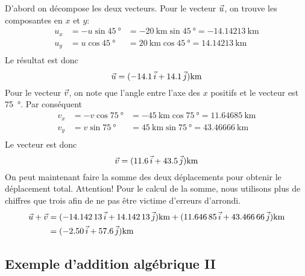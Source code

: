 {  D'abord on décompose les deux vecteurs.  Pour le vecteur $\vec{u}$, on trouve les
  composantes en $x$ et $y$:
  \begin{eqnarray*}
    u_x &= -u \sin \SI{45}{\degree} &= -\SI{20}{\kilo\meter} \sin
      \SI{45}{\degree} = -\SI{14.14213}{\kilo\meter} \\
    u_y &=  u \cos \SI{45}{\degree} &=  \SI{20}{\kilo\meter} \cos
      \SI{45}{\degree} = \SI{14.14213}{\kilo\meter} \\
  \end{eqnarray*}
  Le résultat est donc
  \[
    \vec{u} = (-\num{14.1}\, \vec{i} + \num{14.1}\, \vec{j}) \si{\kilo\meter}
  \]
  Pour le vecteur $\vec{v}$, on note que l'angle entre l'axe des $x$ positifs et
  le vecteur est \SI{75}{\degree}.  Par conséquent
  \begin{eqnarray*}
    v_x &= -v \cos \SI{75}{\degree} &= -\SI{45}{\kilo\meter} \cos
      \SI{75}{\degree} = \SI{11.64685}{\kilo\meter} \\
    v_y &=  v \sin \SI{75}{\degree} &=  \SI{45}{\kilo\meter} \sin
      \SI{75}{\degree} = \SI{43.46666}{\kilo\meter} \\
  \end{eqnarray*}
  Le vecteur est donc
  \[
    \vec{v} = (\num{11.6}\, \vec{i} + \num{43.5}\, \vec{j}) \si{\kilo\meter}
  \]
  On peut maintenant faire la somme des deux déplacements pour obtenir le
  déplacement total.  Attention!  Pour le calcul de la somme, nous utilisons
  plus de chiffres que trois afin de ne pas être victime d'erreurs d'arrondi.
  \begin{align*}
    \vec{u} + \vec{v} &= (-\num{14.14213}\, \vec{i} + \num{14.14213}\, \vec{j}) \si{\kilo\meter}
                +(\num{11.64685}\, \vec{i} + \num{43.46666}\, \vec{j})
                \si{\kilo\meter} \\
              &= (-\num{2.50}\, \vec{i} + \num{57.6}\, \vec{j}) \si{\kilo\meter}
  \end{align*}
}


\subsection{Exemple d'addition algébrique II}

